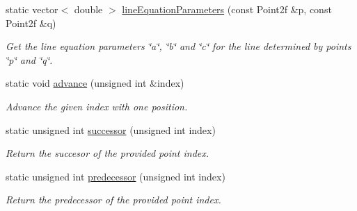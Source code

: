 \begin{DoxyCompactItemize}
static vector$<$ double $>$ \hyperlink{classmultiscale_1_1MinimumAreaEnclosingTriangle_a2aa60ff7b5d82262bbc8498f05882802}{line\-Equation\-Parameters} (const Point2f \&p, const Point2f \&q)
\begin{DoxyCompactList}\small\item\em Get the line equation parameters \char`\"{}a\char`\"{}, \char`\"{}b\char`\"{} and \char`\"{}c\char`\"{} for the line determined by points \char`\"{}p\char`\"{} and \char`\"{}q\char`\"{}. \end{DoxyCompactList}\item 
static void \hyperlink{classmultiscale_1_1MinimumAreaEnclosingTriangle_a4cdd0f627c2fa44aa5b4760d04ee3c80}{advance} (unsigned int \&index)
\begin{DoxyCompactList}\small\item\em Advance the given index with one position. \end{DoxyCompactList}\item 
static unsigned int \hyperlink{classmultiscale_1_1MinimumAreaEnclosingTriangle_a178b8229a0f7a18f7f0050f5c8d859d3}{successor} (unsigned int index)
\begin{DoxyCompactList}\small\item\em Return the succesor of the provided point index. \end{DoxyCompactList}\item 
static unsigned int \hyperlink{classmultiscale_1_1MinimumAreaEnclosingTriangle_a89173019a673e51d0985f45d067f30cb}{predecessor} (unsigned int index)
\begin{DoxyCompactList}\small\item\em Return the predecessor of the provided point index. \end{DoxyCompactList}\end{DoxyCompactItemize}
